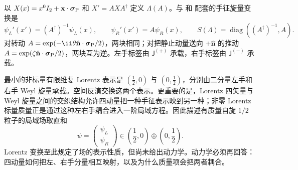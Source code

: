 

\begin{definition}
以 $X(x)=x^0I_2+\mathbf x\cdot\boldsymbol\sigma_{\rm P}$ 和 $X'=AXA^\dagger$ 定义 $\Lambda(A)$。与 和 配套的手征旋量变换是
\begin{equation}
 \psi_L'(x')=(A^\dagger)^{-1}\psi_L(x),\qquad
 \psi_R'(x')=A\psi_R(x),\qquad
 S(\Lambda)=\operatorname{diag}((A^\dagger)^{-1},A).
 \label{eq:feqo-sl2c-chiral-dictionary}
\end{equation}
对转动 $A=\exp(-\ii\theta\hat{\mathbf n}\cdot\boldsymbol\sigma_{\rm P}/2)$，两块相同；对把静止动量送向 $+\hat{\mathbf n}$ 的推动 $A=\exp(\zeta\hat{\mathbf n}\cdot\boldsymbol\sigma_{\rm P}/2)$，两块互为逆。左手标签由 $\mathsf J^{(+)}$ 承载，右手标签由 $\mathsf J^{(-)}$ 承载。
\end{definition}

最小的非标量有限维复 Lorentz 表示是 $(\tfrac12,0)$ 与 $(0,\tfrac12)$，分别由二分量左手和右手 Weyl 旋量承载。空间反演交换这两个表示。更重要的是，Lorentz 四矢量与 Weyl 旋量之间的交织结构允许四动量把一种手征表示映到另一种；非零 Lorentz 标量质量正是通过这种左右手耦合进入一阶局域方程。因此描述有质量自旋 $1/2$ 粒子的局域场取直和
\begin{equation}
 \boxed{
 \psi=\begin{pmatrix}\psi_L\\ \psi_R\end{pmatrix}
 \in \left(\frac12,0\right)\oplus\left(0,\frac12\right).}
 \label{eq:dirac-rep}
\end{equation}
Lorentz 变换至此规定了场的表示性质，但尚未给出动力学。动力学必须再回答：四动量如何把左、右手分量相互映射，以及为什么质量项会把两者耦合。

